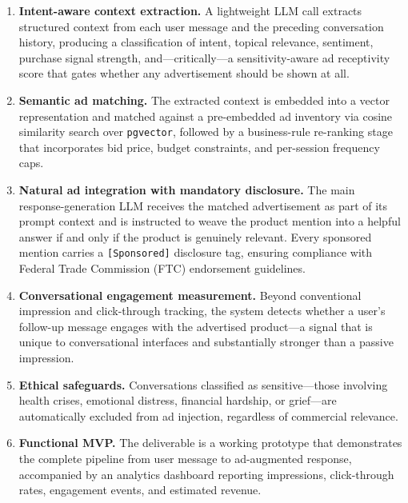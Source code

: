 \begin{enumerate}[label=(\roman*), leftmargin=2.5em]
  \item \textbf{Intent-aware context extraction.} A lightweight LLM call
    extracts structured context from each user message and the preceding
    conversation history, producing a classification of intent, topical
    relevance, sentiment, purchase signal strength, and---critically---a
    sensitivity-aware ad receptivity score that gates whether any advertisement
    should be shown at all.

  \item \textbf{Semantic ad matching.} The extracted context is embedded into a
    vector representation and matched against a pre-embedded ad inventory via
    cosine similarity search over \texttt{pgvector}, followed by a business-rule
    re-ranking stage that incorporates bid price, budget constraints, and
    per-session frequency caps.

  \item \textbf{Natural ad integration with mandatory disclosure.} The main
    response-generation LLM receives the matched advertisement as part of its
    prompt context and is instructed to weave the product mention into a helpful
    answer if and only if the product is genuinely relevant. Every sponsored
    mention carries a \texttt{[Sponsored]} disclosure tag, ensuring compliance
    with Federal Trade Commission (FTC) endorsement guidelines.

  \item \textbf{Conversational engagement measurement.} Beyond conventional
    impression and click-through tracking, the system detects whether a user's
    follow-up message engages with the advertised product---a signal that is
    unique to conversational interfaces and substantially stronger than a
    passive impression.

  \item \textbf{Ethical safeguards.} Conversations classified as sensitive---those
    involving health crises, emotional distress, financial hardship, or
    grief---are automatically excluded from ad injection, regardless of
    commercial relevance.

  \item \textbf{Functional MVP.} The deliverable is a working prototype that
    demonstrates the complete pipeline from user message to ad-augmented
    response, accompanied by an analytics dashboard reporting impressions,
    click-through rates, engagement events, and estimated revenue.
\end{enumerate}

